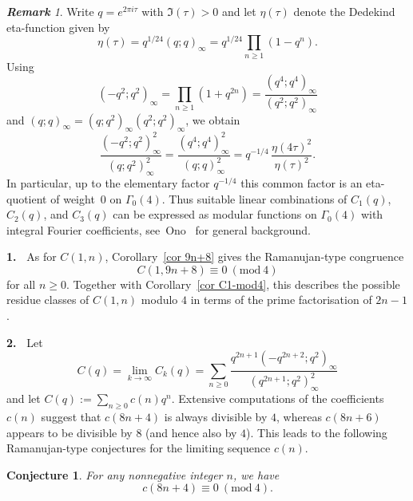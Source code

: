 \documentclass[reqno]{amsart}
\theoremstyle{definition}
\theoremstyle{plain}
\newtheorem{conjecture} {Conjecture}
\theoremstyle{remark}
\newtheorem{remark}{{\bf Remark}}
\numberwithin{equation}{section}
\newcommand{\Mod}[1]{\ (\mathrm{mod}\ #1)}
\newcommand{\fr}{\frac}
\begin{document}
\begin{remark}\label{rem eta-quotient}%
Write $q=e^{2\pi i\tau}$ with $\Im(\tau)>0$ and let $\eta(\tau)$ denote the Dedekind eta-function given by
\[
\eta(\tau)=q^{1/24}(q;q)_\infty
=q^{1/24}\prod_{n\ge1}(1-q^n).
\]
Using
\[
(-q^2;q^2)_\infty = \prod_{n\geq 1}(1+q^{2n}) = \frac{(q^4;q^4)_\infty}{(q^2;q^2)_\infty}
\]
and $(q;q)_\infty = (q;q^2)_\infty(q^2;q^2)_\infty$, we obtain
\[
\frac{(-q^2;q^2)_\infty^2}{(q;q^2)_\infty^2}
 = \frac{(q^4;q^4)_\infty^2}{(q;q)_\infty^2}
 = q^{-1/4}\,\frac{\eta(4\tau)^2}{\eta(\tau)^2}.
\]
In particular, up to the elementary factor $q^{-1/4}$ this common factor is an eta-quotient of weight~$0$ on $\Gamma_0(4)$. Thus suitable linear combinations of $C_1(q)$, $C_2(q)$, and $C_3(q)$ can be
expressed as modular functions on $\Gamma_0(4)$ with integral Fourier coefficients, see~Ono~\cite{Ono} for general background.
\end{remark}

{\bf 1.\ } As for $C(1,n)$, Corollary~\ref{cor 9n+8} gives the Ramanujan-type congruence
\[
C(1,9n+8) \equiv 0 \Mod{4}
\]
for all $n\geq 0$. Together with Corollary~\ref{cor C1-mod4}, this describes the possible residue classes of
$C(1,n)$ modulo $4$ in terms of the prime factorisation of $2n-1$.
%

{\bf 2.\ } Let
\[
C(q)=\lim_{k\to\infty} C_k(q) = \sum_{n\geq 0}\frac{q^{2n+1} (-q^{2n+2};q^2)_\infty}{(q^{2n+1};q^2)_\infty^2}
\]
and let $C(q) := \sum_{n\geq 0} c(n)q^n$.
Extensive computations of the coefficients $c(n)$ suggest that $c(8n+4)$ is always divisible by $4$, whereas $c(8n+6)$
appears to be divisible by $8$ (and hence also by $4$). This leads to the following Ramanujan-type conjectures for the limiting sequence $c(n)$.

\begin{conjecture}\label{conj-2}
For any nonnegative integer $n$, we have
\[
c(8n+4) \equiv 0 \Mod{4}.
\]
\end{conjecture}
\end{document}
